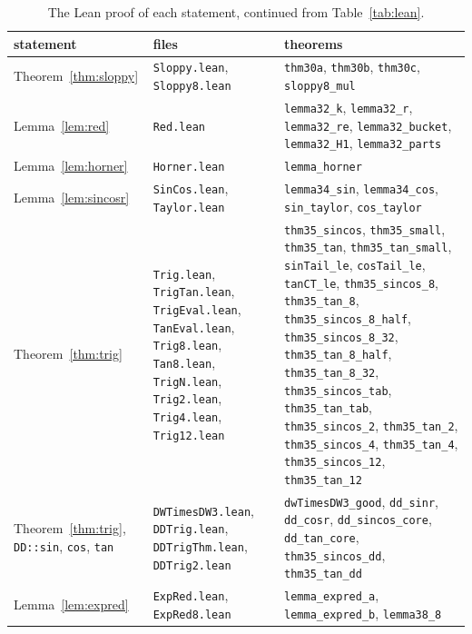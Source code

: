 \begin{table}[tp]
\centering
\caption{The Lean proof of each statement, continued from Table~\ref{tab:lean}.}
\label{tab:lean2}
\footnotesize
\begin{tabular}{@{}>{\raggedright\arraybackslash}p{3.3cm}>{\raggedright\arraybackslash}p{5.0cm}>{\raggedright\arraybackslash}p{8.6cm}@{}}
\toprule
statement & files & theorems \\
\midrule
Theorem~\ref{thm:sloppy} & \texttt{Sloppy.lean}, \texttt{Sloppy8.lean} & \texttt{thm30a}, \texttt{thm30b},
  \texttt{thm30c}, \texttt{sloppy8\_mul} \\
Lemma~\ref{lem:red} & \texttt{Red.lean} & \texttt{lemma32\_k}, \texttt{lemma32\_r}, \texttt{lemma32\_re},
  \texttt{lemma32\_bucket}, \texttt{lemma32\_H1}, \texttt{lemma32\_parts} \\
Lemma~\ref{lem:horner} & \texttt{Horner.lean} & \texttt{lemma\_horner} \\
Lemma~\ref{lem:sincosr} & \texttt{SinCos.lean}, \texttt{Taylor.lean} & \texttt{lemma34\_sin}, \texttt{lemma34\_cos},
  \texttt{sin\_taylor}, \texttt{cos\_taylor} \\
Theorem~\ref{thm:trig} & \texttt{Trig.lean}, \texttt{TrigTan.lean}, \texttt{TrigEval.lean}, \texttt{TanEval.lean},
  \texttt{Trig8.lean}, \texttt{Tan8.lean}, \texttt{TrigN.lean}, \texttt{Trig2.lean}, \texttt{Trig4.lean},
  \texttt{Trig12.lean} &
  \texttt{thm35\_sincos}, \texttt{thm35\_small}, \texttt{thm35\_tan},
  \texttt{thm35\_tan\_small}, \texttt{sinTail\_le}, \texttt{cosTail\_le}, \texttt{tanCT\_le},
  \texttt{thm35\_sincos\_8}, \texttt{thm35\_tan\_8}, \texttt{thm35\_sincos\_8\_half},
  \texttt{thm35\_sincos\_8\_32}, \texttt{thm35\_tan\_8\_half}, \texttt{thm35\_tan\_8\_32},
  \texttt{thm35\_sincos\_tab}, \texttt{thm35\_tan\_tab}, \texttt{thm35\_sincos\_2}, \texttt{thm35\_tan\_2},
  \texttt{thm35\_sincos\_4}, \texttt{thm35\_tan\_4},
  \texttt{thm35\_sincos\_12}, \texttt{thm35\_tan\_12} \\
Theorem~\ref{thm:trig}, \texttt{DD::sin}, \texttt{cos}, \texttt{tan} & \texttt{DWTimesDW3.lean},
  \texttt{DDTrig.lean}, \texttt{DDTrigThm.lean}, \texttt{DDTrig2.lean} & \texttt{dwTimesDW3\_good},
  \texttt{dd\_sinr}, \texttt{dd\_cosr}, \texttt{dd\_sincos\_core}, \texttt{dd\_tan\_core},
  \texttt{thm35\_sincos\_dd}, \texttt{thm35\_tan\_dd} \\
Lemma~\ref{lem:expred} & \texttt{ExpRed.lean}, \texttt{ExpRed8.lean} & \texttt{lemma\_expred\_a},
  \texttt{lemma\_expred\_b}, \texttt{lemma38\_8} \\

\end{tabular}
\end{table}
